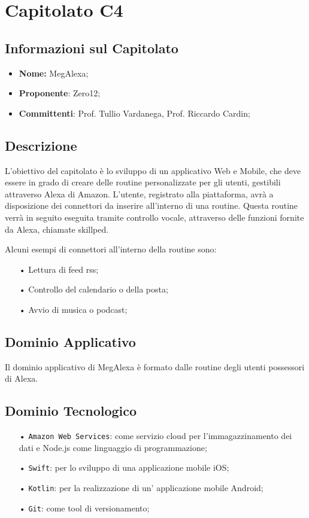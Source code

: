\section{Capitolato C4}
\subsection{Informazioni sul Capitolato}
\begin{itemize}
	\item \textbf{Nome:} MegAlexa;
	\item \textbf{Proponente}: Zero12;
	\item \textbf{Committenti}: Prof. Tullio Vardanega, Prof. Riccardo Cardin;
\end{itemize}

\subsection{Descrizione}
L'obiettivo del capitolato è lo sviluppo di un applicativo Web e Mobile, che deve essere in grado di creare delle routine personalizzate per gli utenti, gestibili attraverso Alexa di Amazon.
L'utente, registrato alla piattaforma, avrà a disposizione dei connettori da inserire all'interno di una routine. Questa routine verrà in seguito eseguita tramite controllo vocale, attraverso delle funzioni fornite da Alexa, chiamate skillped.

Alcuni esempi di connettori all'interno della routine sono:
\begin{itemize}
\item[•] Lettura di feed rss;
\item[•] Controllo del calendario o della posta;
\item[•] Avvio di musica o podcast;
\end{itemize}

\subsection{Dominio Applicativo}
Il dominio applicativo di MegAlexa è formato dalle routine degli utenti possessori di Alexa.

\subsection{Dominio Tecnologico}
\begin{itemize}

\item[•] \texttt{Amazon Web Services}: come servizio cloud per l'immagazzinamento dei dati e Node.js come linguaggio di programmazione;
\item[•] \texttt{Swift}: per lo sviluppo di una applicazione mobile iOS;
\item[•] \texttt{Kotlin}: per la realizzazione di un' applicazione mobile Android;
\item[•] \texttt{Git}: come tool di versionamento;

\end{itemize}

